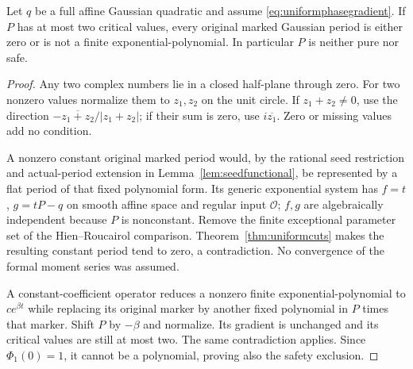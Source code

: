 \begin{corollary}\label{cor:twocriticalvalues}
Let $q$ be a full affine Gaussian quadratic and assume
\eqref{eq:uniformphasegradient}. If $P$ has at most two critical
values, every original marked Gaussian period is either zero or
is not a finite exponential-polynomial. In particular $P$ is
neither pure nor safe.
\end{corollary}
\begin{proof}
Any two complex numbers lie in a closed half-plane through zero.
For two nonzero values normalize them to $z_1,z_2$ on the unit
circle. If $z_1+z_2\ne0$, use the direction
$-\overline{z_1+z_2}/|z_1+z_2|$; if their sum is zero, use
$i\overline{z_1}$. Zero or missing values add no condition.

A nonzero constant original marked period would, by the rational
seed restriction and actual-period extension in
Lemma~\ref{lem:seedfunctional}, be represented by a flat period
of that fixed polynomial form. Its generic exponential system
has $f=t$, $g=tP-q$ on smooth affine space and regular input
$\mathcal O$; $f,g$ are algebraically independent because $P$
is nonconstant. Remove the finite exceptional parameter set of
the Hien--Roucairol comparison. Theorem~\ref{thm:uniformcuts}
makes the resulting constant period tend to zero, a contradiction.
No convergence of the formal moment series was assumed.

A constant-coefficient operator reduces a nonzero finite
exponential-polynomial to $c e^{\beta t}$ while replacing its
original marker by another fixed polynomial in $P$ times that
marker. Shift $P$ by $-\beta$ and normalize. Its gradient is
unchanged and its critical values are still at most two. The
same contradiction applies. Since $\Phi_1(0)=1$, it cannot be
a polynomial, proving also the safety exclusion.
\end{proof}
